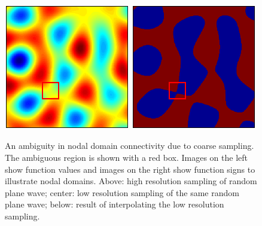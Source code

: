 \documentclass{report}
\begin{document}
\begin{figure}
\begin{center}
    \linebreak
    \includegraphics[width=0.49\textwidth]{figs/interpolation/interp_sample_interpolated_all.eps}
    \includegraphics[width=0.49\textwidth]{figs/interpolation/interp_sample_interpolated_all_domains.eps}
    \caption{An ambiguity in nodal domain connectivity due to coarse sampling. The ambiguous region is shown with a red box. Images on the left show function values and images on the right show function signs to illustrate nodal domains. Above: high resolution sampling of random plane wave; center: low resolution sampling of the same random plane wave; below: result of interpolating the low resolution sampling.}
    \label{fig:interpolation_sample}
  \end{center}
\end{figure}
\end{document}

